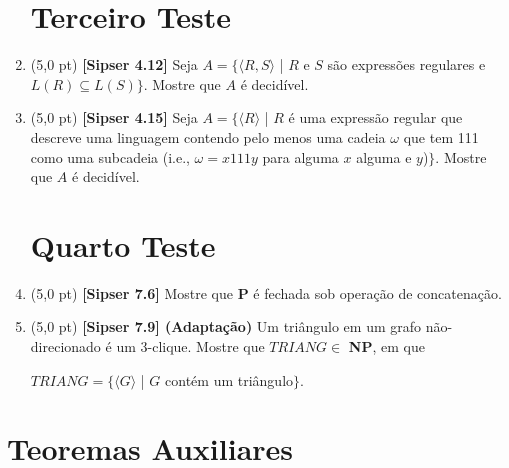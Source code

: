 \documentclass[12pt,a4paper,oneside]{article}
\begin{document}
\begin{enumerate}
	
	\section{Terceiro Teste}
	
	\item (5,0 pt)	{\bf [Sipser 4.12]} Seja $A = \{\langle R,S \rangle$ | $R$ e $S$ são expressões regulares e $L(R) \subseteq L(S)\}$. Mostre que $A$ é decidível.

	\item (5,0 pt) {\bf [Sipser 4.15]}  Seja $A = \{\langle R \rangle$ | $R$ é uma expressão regular que descreve uma linguagem contendo pelo menos uma cadeia $\omega$ que tem 111 como uma subcadeia (i.e., $\omega = x111y$ para alguma $x$ alguma e $y$)$\}$. Mostre que $A$ é decidível.
	
	\section*{Quarto Teste}
	
	\item (5,0 pt) {\bf [Sipser 7.6]}  Mostre que {\bf P} é fechada sob operação de concatenação.

	\item (5,0 pt)  {\bf [Sipser 7.9] (Adaptação)} Um triângulo em um grafo não-direcionado é um 3-clique. Mostre que $TRIANG \in$ {\bf NP}, em que 
	\begin{center}
		$TRIANG = \{ \langle G \rangle$ | $G$ contém um triângulo$\}$.
	\end{center}
	
	

\end{enumerate}

\section*{Teoremas Auxiliares}
\end{document}
